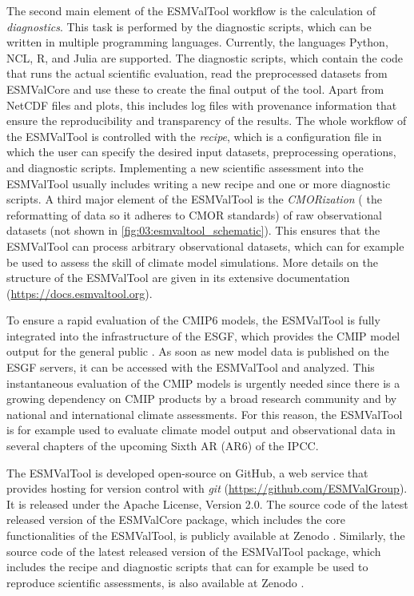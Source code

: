 The second main element of the \ac{ESMValTool} workflow is the calculation of
\emph{diagnostics}. This task is performed by the diagnostic scripts, which can
be written in multiple programming languages. Currently, the languages Python,
NCL, R, and Julia are supported. The diagnostic scripts, which contain the code
that runs the actual scientific evaluation, read the preprocessed datasets from
\ac{ESMValCore} and use these to create the final output of the tool. Apart
from \ac{NetCDF} files and plots, this includes log files with provenance
information that ensure the reproducibility and transparency of the results.
The whole workflow of the \ac{ESMValTool} is controlled with the \emph{recipe},
which is a configuration file in which the user can specify the desired input
datasets, preprocessing operations, and diagnostic scripts. Implementing a new
scientific assessment into the \ac{ESMValTool} usually includes writing a new
recipe and one or more diagnostic scripts. A third major element of the
\ac{ESMValTool} is the \emph{\acs{CMOR}ization} (\ie{} the reformatting of data
so it adheres to \ac{CMOR} standards) of raw observational datasets (not shown
in \cref{fig:03:esmvaltool_schematic}). This ensures that the \ac{ESMValTool}
can process arbitrary observational datasets, which can for example be used to
assess the skill of climate model simulations. More details on the structure of
the \ac{ESMValTool} are given in its extensive documentation
(\url{https://docs.esmvaltool.org}).

To ensure a rapid evaluation of the \acs{CMIP}6 models, the \ac{ESMValTool} is
fully integrated into the infrastructure of the \ac{ESGF}, which provides the
\ac{CMIP} model output for the general public \autocite{Eyring2016b}. As soon
as new model data is published on the \ac{ESGF} servers, it can be accessed
with the \ac{ESMValTool} and analyzed. This instantaneous evaluation of the
\ac{CMIP} models is urgently needed since there is a growing dependency on
\ac{CMIP} products by a broad research community and by national and
international climate assessments. For this reason, the \ac{ESMValTool} is for
example used to evaluate climate model output and observational data in several
chapters of the upcoming Sixth \acl{AR} (\acs{AR}6) of the \ac{IPCC}.

The \ac{ESMValTool} is developed open-source on GitHub, a web service that
provides hosting for version control with \emph{git}
(\url{https://github.com/ESMValGroup}). It is released under the Apache
License, Version 2.0. The source code of the latest released version of the
\ac{ESMValCore} package, which includes the core functionalities of the
\ac{ESMValTool}, is publicly available at Zenodo \autocite{Andela2020a}.
Similarly, the source code of the latest released version of the
\ac{ESMValTool} package, which includes the recipe and diagnostic scripts that
can for example be used to reproduce scientific assessments, is also available
at Zenodo \autocite{Andela2020}.



